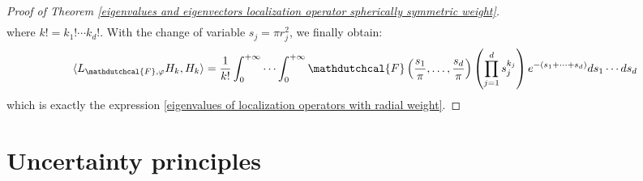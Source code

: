 \documentclass[corpo=11pt, stile=classica, tipotesi=custom,
greek, evenboxes, english]{toptesi}
\numberwithin{equation}{chapter}
\theoremstyle{remark}
\begin{document}
\begin{proof}[Proof of Theorem \ref{eigenvalues and eigenvectors localization operator spherically symmetric weight}]
\begin{align*}
	\end{align*}
	where $k! = k_1! \cdots k_d!$. With the change of variable $s_j = \pi r_j^2$, we finally obtain:
	\begin{equation*}
		\langle  L_{\mathdutchcal{F},\varphi}H_k,H_k\rangle = \dfrac{1}{k!} \int_0^{+\infty} \cdots \int_0^{+\infty} \mathdutchcal{F}\left(\frac{s_1}{\pi},\ldots,\frac{s_d}{\pi}\right) \left(\prod_{j=1}^{d} s_j^{k_j} \right) e^{-(s_1 + \cdots + s_d)} ds_1 \cdots ds_d
	\end{equation*}
	which is exactly the expression \eqref{eigenvalues of localization operators with radial weight}.
\end{proof}





\chapter{Uncertainty principles}\label{chapter uncertainty principles}
\end{document}
